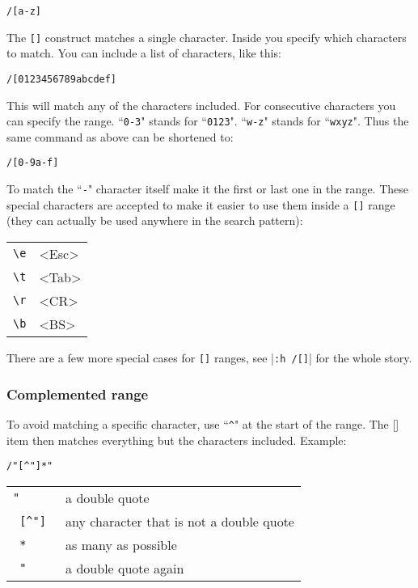 \begin{Verbatim}[samepage=true]
 /[a-z]
\end{Verbatim}

The \texttt{[]} construct matches a single character.
Inside you specify which characters to match.
You can include a list of characters, like this:

\begin{Verbatim}[samepage=true]
 /[0123456789abcdef]
\end{Verbatim}

This will match any of the characters included.
For consecutive characters you can specify the range.
``\texttt{0-3}" stands for ``\texttt{0123}".
``\texttt{w-z}" stands for ``\texttt{wxyz}".
Thus the same command as above can be shortened to:

\begin{Verbatim}[samepage=true]
 /[0-9a-f]
\end{Verbatim}

To match the ``\texttt{-}" character itself make it the first or last one in the range.
These special characters are accepted to make it easier to use them inside a \texttt{[]} range (they can actually be used anywhere in the search pattern):

\begin{center} \begin{tabular}{l l}
		\texttt{\textbackslash{}e} & <Esc> \\
		\texttt{\textbackslash{}t} & <Tab> \\
		\texttt{\textbackslash{}r} & <CR>  \\
		\texttt{\textbackslash{}b} & <BS>  \\
\end{tabular} \end{center}

There are a few more special cases for \texttt{[]} ranges, see |\texttt{:h /[]}| for the whole story.
\subsubsection{Complemented range}
To avoid matching a specific character, use ``\texttt{\^{}}" at the start of the range.
The [] item then matches everything but the characters included.
Example:

\begin{Verbatim}[samepage=true]
 /"[^"]*"
\end{Verbatim}

\begin{center} \begin{tabular}{l l}
				\texttt{"      } & a double quote \\
				\texttt{ [\^{}"]  } & any character that is not a double quote \\
				\texttt{     * } & as many as possible \\
				\texttt{      "} & a double quote again \\
\end{tabular} \end{center}

